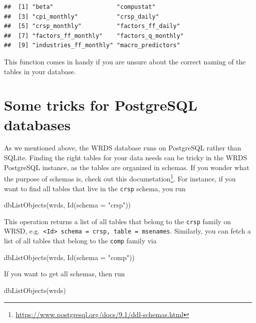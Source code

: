 \documentclass[
]{krantz}
\newenvironment{Shaded}{\begin{snugshade}}{\end{snugshade}}
\newcommand{\AttributeTok}[1]{\textcolor[rgb]{0.61,0.61,0.61}{#1}}
\newcommand{\FunctionTok}[1]{\textcolor[rgb]{0,0,0}{#1}}
\newcommand{\NormalTok}[1]{#1}
\newcommand{\StringTok}[1]{\textcolor[rgb]{0.5,0.5,0.5}{#1}}
\renewcommand{\href}[2]{#2\footnote{\url{#1}}}
\begin{document}
\begin{verbatim}
##  [1] "beta"                  "compustat"            
##  [3] "cpi_monthly"           "crsp_daily"           
##  [5] "crsp_monthly"          "factors_ff_daily"     
##  [7] "factors_ff_monthly"    "factors_q_monthly"    
##  [9] "industries_ff_monthly" "macro_predictors"
\end{verbatim}

This function comes in handy if you are unsure about the correct naming of the tables in your database.

\hypertarget{some-tricks-for-postgresql-databases}{%
\section{Some tricks for PostgreSQL databases}\label{some-tricks-for-postgresql-databases}}

As we mentioned above, the WRDS database runs on PostgreSQL rather than SQLite. Finding the right tables for your data needs can be tricky in the WRDS PostgreSQL instance, as the tables are organized in schemas. If you wonder what the purpose of schemas is, check out \href{https://www.postgresql.org/docs/9.1/ddl-schemas.html}{this documetation}. For instance, if you want to find all tables that live in the \texttt{crsp} schema, you run

\begin{Shaded}
\begin{Highlighting}[]
\FunctionTok{dbListObjects}\NormalTok{(wrds, }\FunctionTok{Id}\NormalTok{(}\AttributeTok{schema =} \StringTok{"crsp"}\NormalTok{))}
\end{Highlighting}
\end{Shaded}

This operation returns a list of all tables that belong to the \texttt{crsp} family on WRSD, e.g.~\texttt{\textless{}Id\textgreater{}\ schema\ =\ crsp,\ table\ =\ msenames}. Similarly, you can fetch a list of all tables that belong to the \texttt{comp} family via

\begin{Shaded}
\begin{Highlighting}[]
\FunctionTok{dbListObjects}\NormalTok{(wrds, }\FunctionTok{Id}\NormalTok{(}\AttributeTok{schema =} \StringTok{"comp"}\NormalTok{))}
\end{Highlighting}
\end{Shaded}

If you want to get all schemas, then run

\begin{Shaded}
\begin{Highlighting}[]
\FunctionTok{dbListObjects}\NormalTok{(wrds)}
\end{Highlighting}
\end{Shaded}
\end{document}
